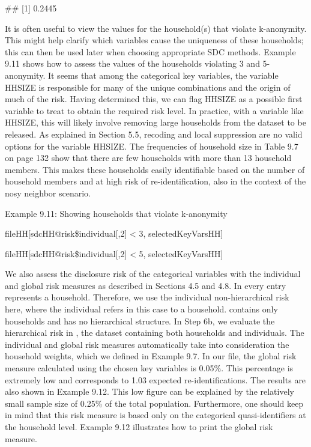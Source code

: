 \documentclass[letterpaper,10pt,english]{sphinxmanual}
\begin{document}
\#\# {[}1{]} 0.2445

It is often useful to view the values for the household(s) that violate
k-anonymity. This might help clarify which variables cause the
uniqueness of these households; this can then be used later when
choosing appropriate SDC methods. Example 9.11 shows how to assess the
values of the households violating 3 and 5-anonymity. It seems that
among the categorical key variables, the variable HHSIZE is responsible
for many of the unique combinations and the origin of much of the risk.
Having determined this, we can flag HHSIZE as a possible first variable
to treat to obtain the required risk level. In practice, with a variable
like HHSIZE, this will likely involve removing large households from the
dataset to be released. As explained in Section 5.5, recoding and local
suppression are no valid options for the variable HHSIZE. The
frequencies of household size in Table 9.7 on page 132 show that there
are few households with more than 13 household members. This makes these
households easily identifiable based on the number of household members
and at high risk of re-identification, also in the context of the nosy
neighbor scenario.

Example 9.11: Showing households that violate k-anonymity

\begin{DUlineblock}{0em}
\item[] 
\item[] fileHH{[}sdcHH@risk\$individual{[},2{]} \textless{} 3, selectedKeyVarsHH{]} 
\end{DUlineblock}

fileHH{[}sdcHH@risk\$individual{[},2{]} \textless{} 5, selectedKeyVarsHH{]} 

We also assess the disclosure risk of the categorical variables with the
individual and global risk measures as described in Sections 4.5 and
4.8. In  every entry represents a household. Therefore, we use
the individual non-hierarchical risk here, where the individual refers
in this case to a household.  contains only households and has
no hierarchical structure. In Step 6b, we evaluate the hierarchical risk
in , the dataset containing both households and individuals. The
individual and global risk measures automatically take into
consideration the household weights, which we defined in Example 9.7. In
our file, the global risk measure calculated using the chosen key
variables is 0.05\%. This percentage is extremely low and corresponds to
1.03 expected re-identifications. The results are also shown in Example
9.12. This low figure can be explained by the relatively small sample
size of 0.25\% of the total population. Furthermore, one should keep in
mind that this risk measure is based only on the categorical
quasi-identifiers at the household level. Example 9.12 illustrates how
to print the global risk measure.
\end{document}
